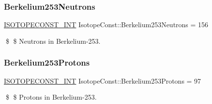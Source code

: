 \subsubsection{\texorpdfstring{Berkelium253\+Neutrons}{Berkelium253Neutrons}}
{\footnotesize\ttfamily \mbox{\hyperlink{group___isotope_const-_macros_ga5f18360b3e99483a35c32d789e62621c}{I\+S\+O\+T\+O\+P\+E\+C\+O\+N\+S\+T\+\_\+\+I\+NT}} Isotope\+Const\+::\+Berkelium253\+Neutrons = 156}

\$ \$ Neutrons in Berkelium-\/253. \mbox{\label{group___isotope_const-_berkelium-_bk253_ga885fb78d1dadf106a56cafa753b4853b}} 
\subsubsection{\texorpdfstring{Berkelium253\+Protons}{Berkelium253Protons}}
{\footnotesize\ttfamily \mbox{\hyperlink{group___isotope_const-_macros_ga5f18360b3e99483a35c32d789e62621c}{I\+S\+O\+T\+O\+P\+E\+C\+O\+N\+S\+T\+\_\+\+I\+NT}} Isotope\+Const\+::\+Berkelium253\+Protons = 97}

\$ \$ Protons in Berkelium-\/253. 